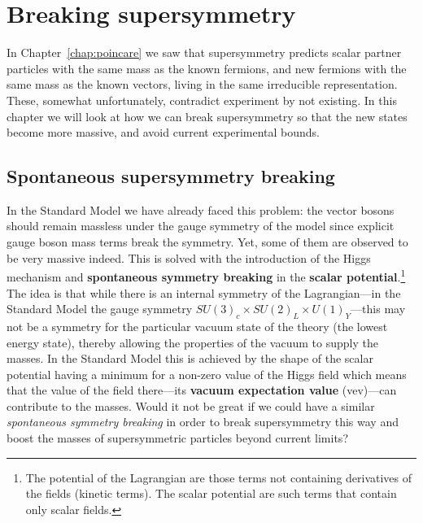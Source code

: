 \documentclass[notes.tex]{subfiles}
\begin{document}
\chapter{Breaking supersymmetry}
\label{chap:breaking}
In Chapter~\ref{chap:poincare} we  saw that  supersymmetry predicts scalar partner particles with the same mass as the known fermions, and new fermions with the same mass as the known vectors, living in the same irreducible representation. These, somewhat unfortunately, contradict experiment by not existing. In this chapter we will look at how we can break supersymmetry so that the new states become more massive, and avoid current experimental bounds. 



\section{Spontaneous supersymmetry breaking}
\label{sec:ssb}
In the Standard Model we have already faced this problem: the vector bosons should remain massless under the gauge symmetry of the model since explicit gauge boson mass terms break the symmetry. Yet, some of them are observed to be very massive indeed. This is solved with the introduction of the Higgs mechanism and {\bf spontaneous symmetry breaking} in the {\bf scalar potential}.\footnote{The potential of the Lagrangian are those terms not containing derivatives of the fields (kinetic terms). The scalar potential are such terms that contain only scalar fields.} The idea is that while there is an internal symmetry of the Lagrangian---in the Standard Model the gauge symmetry $SU(3)_c\times SU(2)_L\times U(1)_Y$---this may not be a symmetry for the particular vacuum state of the theory (the lowest energy state), thereby allowing the properties of the vacuum to supply the masses. In the Standard Model this is achieved by the shape of the scalar potential having a minimum for a non-zero value of the Higgs field which means that the value of the field there---its {\bf vacuum expectation value} (vev)---can contribute to the masses. Would it not be great if we could have a similar {\it spontaneous symmetry breaking} in order to break supersymmetry this way and boost the masses of supersymmetric particles beyond current limits?
\end{document}
